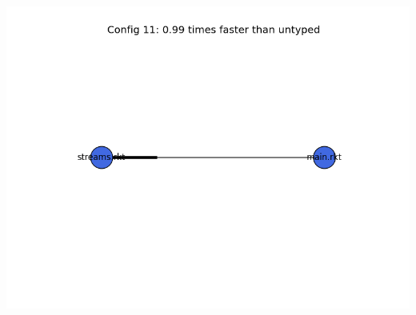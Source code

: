 \documentclass{article}
\begin{document}
\begin{itemize}
\includegraphics[width=\textwidth]{sieve-2015-04-06-module-graph-11.png}
\end{itemize}
\end{document}
